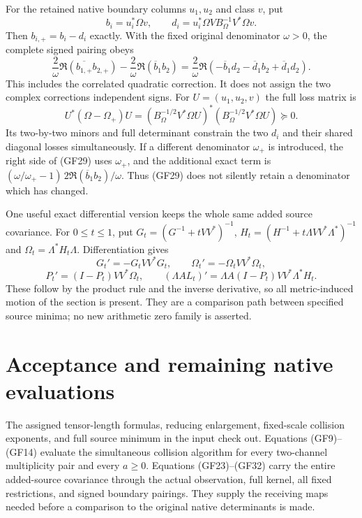 \documentclass[11pt]{article}
\begin{document}
For the retained native boundary columns $u_1,u_2$ and class $v$, put
\[
b_i=u_i^*\Omega v,\qquad
d_i=u_i^*\Omega V B_\Omega^{-1}V^*\Omega v.
\tag{GF28}
\]
Then $b_{i,+}=b_i-d_i$ exactly. With the fixed original denominator
$\omega>0$, the complete signed pairing obeys
\[
\boxed{\frac2\omega\Re(\overline{b_{1,+}}b_{2,+})
-\frac2\omega\Re(\overline b_1b_2)
=\frac2\omega\Re(-\overline b_1d_2-\overline d_1b_2
+\overline d_1d_2).}
\tag{GF29}
\]
This includes the correlated quadratic correction. It does not assign
the two complex corrections independent signs.
For $U=(u_1,u_2,v)$ the full loss matrix is
\[
U^*(\Omega-\Omega_+)U
=(B_\Omega^{-1/2}V^*\Omega U)^*
(B_\Omega^{-1/2}V^*\Omega U)\succeq0.
\tag{GF30}
\]
Its two-by-two minors and full determinant constrain the two $d_i$
and their shared diagonal losses simultaneously. If a different
denominator $\omega_+$ is introduced, the right side of (GF29) uses
$\omega_+$, and the additional exact term is
$(\omega/\omega_+-1)\,2\Re(\overline b_1b_2)/\omega$.
Thus (GF29) does not silently retain a denominator which has changed.

One useful exact differential version keeps the whole same added source
covariance. For $0\le t\le1$, put
$G_t=(G^{-1}+tVV^*)^{-1}$,
$H_t=(H^{-1}+t\Lambda VV^*\Lambda^*)^{-1}$ and
$\Omega_t=\Lambda^*H_t\Lambda$. Differentiation gives
\[
G_t'=-G_tVV^*G_t,\qquad
\Omega_t'=-\Omega_tVV^*\Omega_t,
\tag{GF31}
\]
\[
P_t'=(I-P_t)VV^*\Omega_t,\qquad
(\Lambda A L_t)'=\Lambda A(I-P_t)VV^*\Lambda^*H_t.
\tag{GF32}
\]
These follow by the product rule and the inverse derivative, so all
metric-induced motion of the section is present. They are a comparison
path between specified source minima; no new arithmetic zero family
is asserted.

\section{Acceptance and remaining native evaluations}
The assigned tensor-length formulas, reducing enlargement, fixed-scale
collision exponents, and full source minimum in the input check out.
Equations (GF9)--(GF14) evaluate the simultaneous collision algorithm
for every two-channel multiplicity pair and every $a\ge0$.
Equations (GF23)--(GF32) carry the entire added-source covariance
through the actual observation, full kernel, all fixed restrictions,
and signed boundary pairings. They supply the receiving maps needed
before a comparison to the original native determinants is made.
\end{document}
